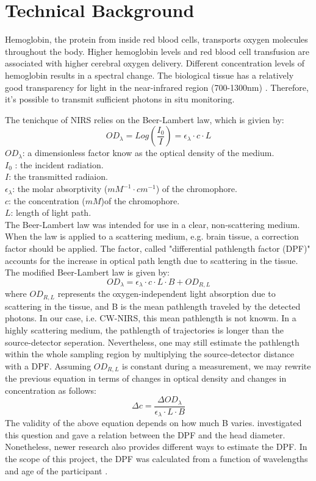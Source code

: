 \section{Technical Background}
Hemoglobin, the protein from inside red blood cells, transports oxygen molecules throughout the body. Higher hemoglobin levels and red blood cell transfusion are associated with higher cerebral oxygen delivery. Different concentration levels of hemoglobin results in a spectral change. The biological tissue has a relatively good transparency for light in the near-infrared region (700-1300nm) \cite{doi:10.1126/science.929199}. Therefore, it's possible to transmit sufficient photons in situ monitoring. 

The tenichque of NIRS relies on the Beer-Lambert law, which is givien by:
\[
OD_{\lambda} = Log(\frac {I_0}{I}) = \epsilon _{\lambda} \cdot c \cdot L
\]
$OD_{\lambda} $: a dimensionless factor know as the optical density of the medium.  \\
$I_0$ : the incident radiation. \\
$I$: the transmitted radiaion. \\
$\epsilon _{\lambda}$: the molar absorptivity ($mM^{-1} \cdot cm^{-1}$) of the chromophore. \\
$c$: the concentration ($mM$)of the chromophore. \\
$L$: length of light path. \\

The Beer-Lambert law was intended for use in a clear, non-scattering medium. When the law is applied to a scattering medium, e.g. brain tissue, a correction factor should be applied. The factor, called "differential pathlength factor (DPF)" accounts for the increase in optical path length due to scattering in the tissue. The modified Beer-Lambert law is given by:
\[
OD_{\lambda} = \epsilon _{\lambda} \cdot c \cdot L \cdot B + OD_{R,L}
\]
where $OD_{R,L}$ represents the oxygen-independent light absorption due to scattering in the tissue, and B is the mean pathlength traveled by the detected photons. In our case, i.e. CW-NIRS, this mean pathlength is not knowm. In a highly scattering medium, the pathlength of trajectories is longer than the source-detector seperation. Nevertheless, one may still estimate the pathlength within the whole sampling region by multiplying the source-detector distance with a DPF. Assuming $OD_{R,L}$ is constant during a measurement, we may rewrite the previous equation in terms of changes in optical density and changes in concentration as follows:
\[
\Delta c =\frac { \Delta OD_{\lambda}} {\epsilon _{\lambda} \cdot L \cdot B}
\]
The validity of the above equation depends on how much B varies. \cite {Delpy_1988} investigated this question and gave a relation between the DPF and the head diameter. Nonetheless, newer research also provides different ways to estimate the DPF. In the scope of this project, the DPF was calculated from a function of wavelengths and age of the participant \cite {Duncan1996MeasurementOC}.







